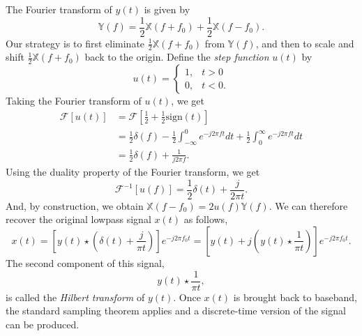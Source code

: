 The Fourier transform of $y(t)$ is given by
\begin{equation*}
\mathbb{Y}(f) = \frac{1}{2} \mathbb{X}(f+f_0) + \frac{1}{2} \mathbb{X}(f - f_0) .
\end{equation*}
Our strategy is to first eliminate $\frac{1}{2} \mathbb{X}(f + f_0)$ from $\mathbb{Y}(f)$, and then to scale and shift $\frac{1}{2} \mathbb{X}(f + f_0)$ back to the origin.
Define the \emph{step function} $u(t)$ by
\begin{equation*}
u (t) = \begin{cases} 1, & t > 0 \\
0, & t < 0. \end{cases}
\end{equation*}
Taking the Fourier transform of $u(t)$, we get
\begin{equation*}
\begin{split}
{\mathcal{F}} [u (t)]
&= {\mathcal{F}} \left[ \frac{1}{2} + \frac{1}{2} \mathrm{sign}(t) \right] \\
&= \frac{1}{2} \delta (f)
- \frac{1}{2} \int_{-\infty}^0 e^{-j2 \pi ft} dt
+ \frac{1}{2} \int_0^{\infty} e^{-j2 \pi ft} dt \\
&= \frac{1}{2} \delta(f)  + \frac{1}{j2 \pi f}.
\end{split}
\end{equation*}
Using the duality property of the Fourier transform, we get
\begin{equation*}
\mathcal{F}^{-1} [u(f)] = \frac{1}{2} \delta(t) + \frac{j}{2 \pi t} .
\end{equation*}
And, by construction, we obtain $\mathbb{X}(f - f_0) = 2 u(f) \mathbb{Y}(f)$.
We can therefore recover the original lowpass signal $x(t)$ as follows,
\begin{equation*}
x(t)
= \left[ y(t) \star \left( \delta (t) + \frac{j}{\pi t} \right) \right] e^{- j2 \pi f_0 t}
= \left[ y(t) + j \left( y(t) \star \frac{1}{\pi t} \right) \right] e^{- j2 \pi f_0 t} .
\end{equation*}
The second component of this signal,
\begin{equation*}
y(t) \star \frac{1}{\pi t} ,
\end{equation*}
is called the \emph{Hilbert transform} of $y(t)$.
Once $x(t)$ is brought back to baseband, the standard sampling theorem applies and a discrete-time version of the signal can be produced.

